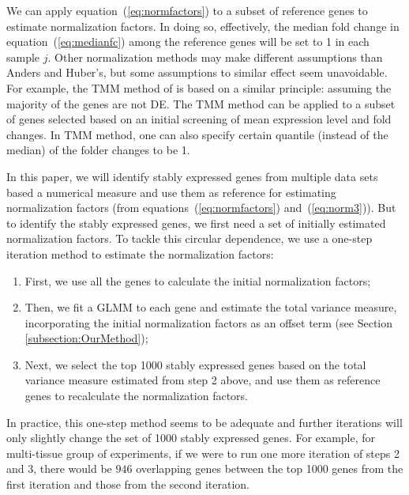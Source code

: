 	We can apply equation~(\ref{eq:normfactors}) to a subset of reference genes to
	estimate normalization factors.  In doing so,  effectively, the median fold
	change in equation~(\ref{eq:medianfc}) among the reference genes will be set
	to 1 in each sample $j$.
	Other normalization methods may make different assumptions
	than Anders and Huber's, but some assumptions to similar effect seem
	unavoidable.  For example, the TMM method of \citet{robinson2010scaling} is
	based on a similar principle: assuming the majority of the genes are not DE.
	The TMM method can be applied to a subset of genes selected based on an
	initial screening of mean expression level and fold changes. In TMM method,
	one can also specify certain quantile (instead of the median) of the folder
	changes to be 1.
	
	In this paper, we will identify stably expressed genes from multiple data sets
	based a numerical measure and use them as reference for estimating
	normalization factors (from equations~(\ref{eq:normfactors}) and~(\ref{eq:norm3})). 
	But to identify the stably expressed genes, we first
	need a set
	of initially estimated normalization factors.  To tackle this circular
	dependence, we use a one-step iteration method to estimate the normalization
	factors: 
	\begin{enumerate}
		\item
		First, we use all the genes to calculate the initial normalization factors; 
		\item
		Then, we fit a GLMM to each gene and estimate the total variance measure, incorporating the initial normalization factors as
		an offset term (see Section \ref{subsection:OurMethod}); 
		\item
		Next, we select the top 1000 stably expressed genes based on the total
		variance measure estimated from step 2 above, and use them as
		reference genes to recalculate the normalization factors. 
	\end{enumerate}
	In practice, this one-step method seems to be adequate and further iterations
	will only slightly change the set of 1000 stably expressed genes.  For
	example, for multi-tissue group of experiments, if we were to run one more
	iteration of steps 2 and 3, there would be $946$ overlapping genes between
	the top 1000 genes from the first iteration and those from the second
	iteration.
	
	
	

